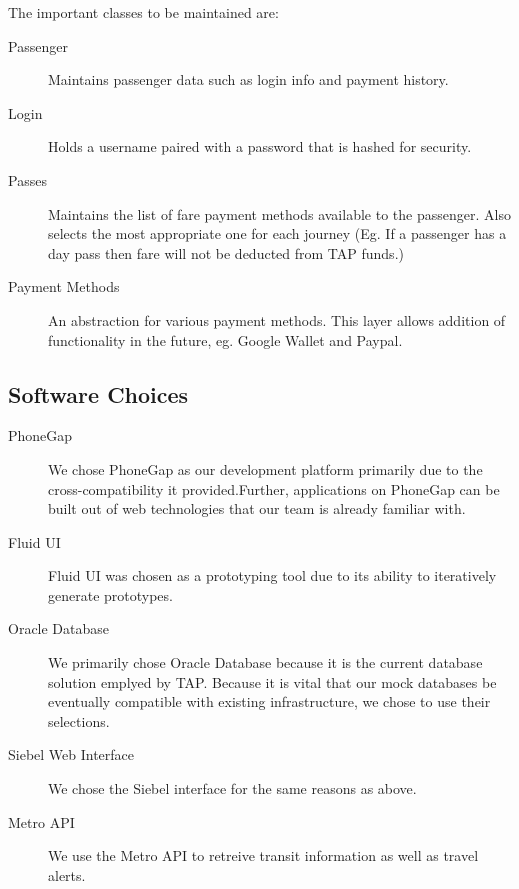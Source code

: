 The important classes to be maintained are:\begin{description}
\item[Passenger] Maintains passenger data such as login info and payment history.
\item[Login] Holds a username paired with a password that is hashed for security.
\item[Passes] Maintains the list of fare payment methods available to the passenger. Also selects the most appropriate one for each journey (Eg. If a passenger has a day pass then fare will not be deducted from TAP funds.)
\item[Payment Methods] An abstraction for various payment methods. This layer allows addition of functionality in the future, eg. Google Wallet and Paypal.
\end{description}

\subsection{Software Choices}
\begin{description}
\item[PhoneGap] We chose PhoneGap as our development platform primarily due to the cross-compatibility it provided.Further, applications on PhoneGap can be built out of web technologies that our team is already familiar with.
\item[Fluid UI] Fluid UI was chosen as a prototyping tool due to its ability to iteratively generate prototypes.
\item[Oracle Database] We primarily chose Oracle Database because it is the current database solution emplyed by TAP. Because it is vital that our mock databases be eventually compatible with existing infrastructure, we chose to use their selections.
\item[Siebel Web Interface] We chose the Siebel interface for the same reasons as above.
\item[Metro API] We use the Metro API to retreive transit information as well as travel alerts.
\end{description}